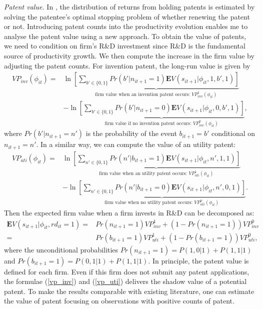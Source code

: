 \documentclass[English]{article}
\begin{document}
\textit{Patent value.} In \cite{pakes1986}, the distribution of returns from holding patents is estimated by solving the patentee's optimal stopping problem of whether renewing the patent or not. Introducing patent counts into the productivity evolution enables me to analyse the patent value using a new approach. To obtain the value of patents, we need to condition on firm's R\&D investment since R\&D is the fundamental source of productivity growth. We then compute the increase in the firm value by adjusting the patent counts. For invention patent, the long-run value is given by
\begin{align} \label{vp_inv}
    VP_{inv}(\phi_{it}) =& \ln \underbrace{\left[\sum_{b'\in\{0, 1\}}Pr(b'|n_{it+1}=1)\mathbf{E}V(s_{it+1}|\phi_{it}, 1, b', 1)\right]}_{\text{firm value when an invention patent occurs: }VP_{inv}^1(\phi_{it})} \\
                         & - \ln \underbrace{\left[\sum_{b'\in\{0, 1\}}Pr(b'|n_{it+1}=0)\mathbf{E}V(s_{it+1}|\phi_{it}, 0, b', 1)\right]}_{\text{firm value if no invention patent occurs: }VP_{inv}^0(\phi_{it})}, \nonumber                
\end{align}
where $Pr(b'|n_{it+1} = n')$ is the probability of the event $b_{it+1} = b'$ conditional on $n_{it+1} = n'$. In a similar way, we can compute the value of an utility patent:
\begin{align} \label{vp_uti}
    VP_{uti}(\phi_{it}) = &  \ln \underbrace{\left[\sum_{n'\in\{0, 1\}}Pr(n'|b_{it+1}=1)\mathbf{E}V(s_{it+1}|\phi_{it}, n', 1, 1)\right]}_{\text{firm value when an utility patent occurs: }VP_{uti}^1(\phi_{it})} \\
                         &-\ln\underbrace{ \left[\sum_{n'\in\{0, 1\}}Pr(n'|b_{it+1}=0)\mathbf{E}V(s_{it+1}|\phi_{it}, n', 0, 1)\right]}_{\text{firm value when no utility patent occurs: } VP_{uti}^0(\phi_{it})}. \nonumber  
\end{align}
Then the expected firm value when a firm invests in R\&D can be decomposed as:
\begin{align}
    \mathbf{E}V(s_{it+1}|\phi_{it}, rd_{it}=1)=& Pr(n_{it+1}=1)VP_{inv}^1 + (1-Pr(n_{it+1}=1))VP_{inv}^0 \\
                                              =& Pr(b_{it+1}=1)VP_{uti}^1+ (1-Pr(b_{it+1}=1))VP_{uti}^0, \nonumber
\end{align}
where the unconditional probabilities $Pr(n_{it+1}=1) = P(1, 0|1)+P(1,1|1)$ and $Pr(b_{it+1}=1) = P(0, 1|1)+P(1,1|1)$. In principle, the patent value is defined for each firm. Even if this firm does not submit any patent applications, the formulae (\ref{vp_inv}) and (\ref{vp_uti}) delivers the shadow value of a potential patent. To make the results comparable with existing literature, one can estimate the value of patent focusing on observations with positive counts of patent. 
\end{document}
